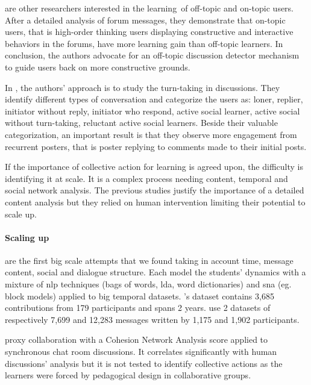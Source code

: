 \documentclass[a4paper,twoside]{article}
\begin{document}
\cite{Wang2016} are other researchers interested in the learning~of off-topic and on-topic users.  After a detailed analysis of forum messages, they demonstrate that on-topic users, that is high-order thinking users displaying constructive and interactive behaviors in the forums, have more learning gain than off-topic learners.  In conclusion, the authors advocate for an off-topic discussion detector mechanism to guide users back on more constructive grounds.

In \citep{Chua2017}, the authors' approach is to study the turn-taking in discussions.  They identify different types of conversation and categorize the users as: loner, replier, initiator without reply, initiator who respond, active social learner, active social without turn-taking, reluctant active social learners.  Beside their valuable categorization, an important result is that they observe more engagement from recurrent posters, that is poster replying to comments made to their initial posts.

If the importance of collective action for learning is agreed upon, the difficulty is identifying it at scale.  It is a complex process needing content, temporal and social network analysis.  The previous studies justify the importance of a detailed content analysis but they relied on human intervention limiting their potential to scale up.

\paragraph{Scaling up}

\cite{Dascalu2017,Boroujeni2017} are the first big scale attempts that we found taking in account time, message content, social and dialogue structure.  Each model the students' dynamics with a mixture of \gls{nlp} techniques (bags of words, \gls{lda}, word dictionaries) and \gls{sna} (eg.  block models) applied to big temporal datasets.  \cite{Dascalu2017}'s dataset contains 3,685 contributions from 179 participants and spans 2 years.  \cite{Boroujeni2017} use 2 datasets of respectively 7,699 and 12,283 messages written by 1,175 and 1,902 participants.

\cite{Dascalu2017} proxy collaboration with a Cohesion Network Analysis score applied to synchronous chat room discussions.  It correlates significantly with human discussions' analysis but it is not tested to identify collective actions as the learners were forced by pedagogical design in collaborative groups.
\end{document}
